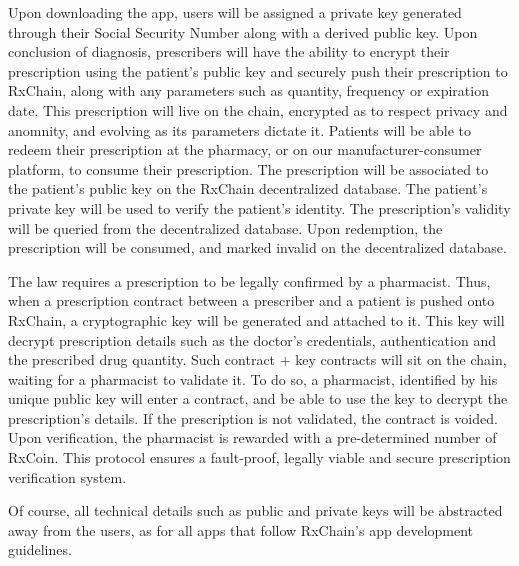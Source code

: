 Upon downloading the app, users will be assigned a private key generated through their Social Security Number
along with a derived public key.
Upon conclusion of diagnosis, prescribers will have the ability to encrypt their prescription using the patient's public key
and securely push their prescription to RxChain, along with any parameters such as quantity, frequency or expiration date.
This prescription will live on the chain, encrypted as to respect privacy and anomnity, and evolving as its parameters dictate it.
Patients will be able to redeem their prescription at the pharmacy, or on our manufacturer-consumer platform, to consume their prescription.
The prescription will be associated to the patient's public key on the RxChain decentralized database.
The patient's private key will be used to verify the patient's identity.
The prescription's validity will be queried from the decentralized database.
Upon redemption, the prescription will be consumed, and marked invalid on the decentralized database.

The law requires a prescription to be legally confirmed by a pharmacist.
Thus, when a prescription contract between a prescriber and a patient is pushed onto RxChain,
a cryptographic key will be generated and attached to it.
This key will decrypt prescription details such as the doctor's credentials, authentication and the prescribed drug quantity.
Such contract + key contracts will sit on the chain, waiting for a pharmacist to validate it.
To do so, a pharmacist, identified by his unique public key will enter a contract,
and be able to use the key to decrypt the prescription's details.
If the prescription is not validated, the contract is voided.
Upon verification, the pharmacist is rewarded with a pre-determined number of RxCoin.
This protocol ensures a fault-proof, legally viable and secure
prescription verification system.

Of course, all technical details such as public and private keys will be abstracted away from the users,
as for all apps that follow RxChain's app development guidelines.

